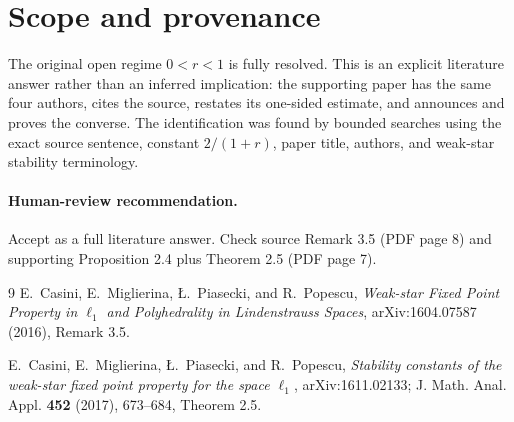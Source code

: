 \documentclass[11pt]{article}
\begin{document}
\section*{Scope and provenance}

The original open regime $0<r<1$ is fully resolved.  This is an explicit
literature answer rather than an inferred implication: the supporting paper
has the same four authors, cites the source, restates its one-sided estimate,
and announces and proves the converse.  The identification was found by
bounded searches using the exact source sentence, constant $2/(1+r)$,
paper title, authors, and weak-star stability terminology.

\paragraph{Human-review recommendation.}
Accept as a full literature answer.  Check source Remark 3.5 (PDF page 8) and
supporting Proposition 2.4 plus Theorem 2.5 (PDF page 7).

\begin{thebibliography}{9}
E.~Casini, E.~Miglierina, \L.~Piasecki, and R.~Popescu,
\emph{Weak-star Fixed Point Property in $\ell_1$ and Polyhedrality in
Lindenstrauss Spaces}, arXiv:1604.07587 (2016), Remark 3.5.

E.~Casini, E.~Miglierina, \L.~Piasecki, and R.~Popescu,
\emph{Stability constants of the weak-star fixed point property for the space
$\ell_1$}, arXiv:1611.02133; J. Math. Anal. Appl. \textbf{452} (2017),
673--684, Theorem 2.5.
\end{thebibliography}
\end{document}
